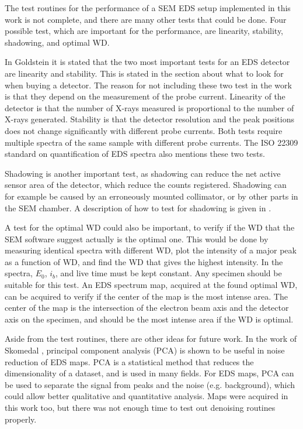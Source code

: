 The test routines for the performance of a SEM EDS setup implemented in this work is not complete, and there are many other tests that could be done.
Four possible test, which are important for the performance, are linearity, stability, shadowing, and optimal WD.

In Goldstein \cite[p. 232]{goldstein_scanning_2018} it is stated that the two most important tests for an EDS detector are linearity and stability.
This is stated in the section about what to look for when buying a detector.
The reason for not including these two test in the work is that they depend on the measurement of the probe current.
Linearity of the detector is that the number of X-rays measured is proportional to the number of X-rays generated.
Stability is that the detector resolution and the peak positions does not change significantly with different probe currents.
Both tests require multiple spectra of the same sample with different probe currents.
The ISO 22309 standard on quantification of EDS spectra \cite{iso_quantification_22309} also mentions these two tests.

Shadowing is another important test, as shadowing can reduce the net active sensor area of the detector, which reduce the counts registered.
Shadowing can for example be caused by an erroneously mounted collimator, or by other parts in the SEM chamber.
A description of how to test for shadowing is given in \cite{shadowing_procop_2016}.

A test for the optimal WD could also be important, to verify if the WD that the SEM software suggest actually is the optimal one.
This would be done by measuring identical spectra with different WD, plot the intensity of a major peak as a function of WD, and find the WD that gives the highest intensity.
In the spectra, $E_0$, $i_b$, and live time must be kept constant.
Any specimen should be suitable for this test.
An EDS spectrum map, acquired at the found optimal WD, can be acquired to verify if the center of the map is the most intense area.
The center of the map is the intersection of the electron beam axis and the detector axis on the specimen, and should be the most intense area if the WD is optimal.

Aside from the test routines, there are other ideas for future work.
In the work of Skomedal \cite{skomedal_improving_2022}, principal component analysis (PCA) is shown to be useful in noise reduction of EDS maps.
PCA is a statistical method that reduces the dimensionality of a dataset, and is used in many fields.
For EDS maps, PCA can be used to separate the signal from peaks and the noise (e.g. background), which could allow better qualitative and quantitative analysis.
Maps were acquired in this work too, but there was not enough time to test out denoising routines properly.


